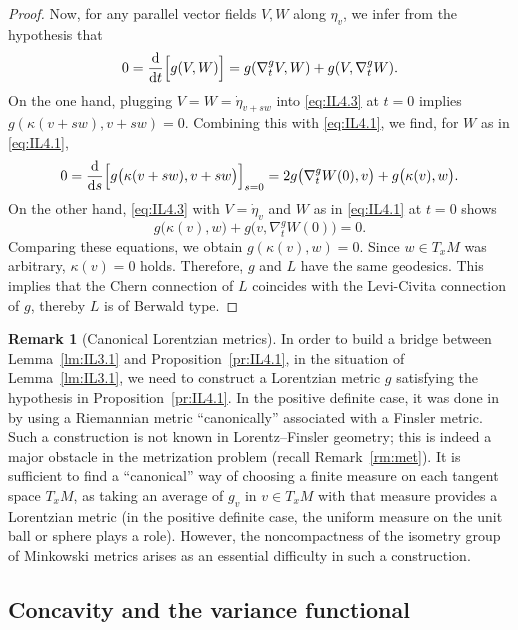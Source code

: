 \documentclass[a4paper,11pt]{article}
\numberwithin{equation}{section}
\theoremstyle{definition}
\newtheorem{remark}[definition]{Remark}
\theoremstyle{plain}
\newcommand{\dd}{\mathrm{d}}
\begin{document}
\begin{proof}
Now, for any parallel vector fields $V,W$ along $\eta_v$, we infer from the hypothesis that
\begin{equation}\label{eq:IL4.3}
0 =\frac{\dd}{\dd t} \Bigl[ g(V,W) \Bigr] =g(\nabla^g_t V,W) +g(V,\nabla^g_t W).
\end{equation}
On the one hand, plugging $V=W=\dot{\eta}_{v+sw}$ into \eqref{eq:IL4.3} at $t=0$ implies $g(\kappa(v+sw),v+sw)=0$.
Combining this with \eqref{eq:IL4.1}, we find, for $W$ as in \eqref{eq:IL4.1},
\[ 0 =\frac{\dd}{\dd s}\Bigl[ g\bigl( \kappa(v+sw),v+sw \bigr) \Bigr]_{s=0}
 =2g\bigl( \nabla^g_t W(0),v \bigr) +g\bigl( \kappa(v),w \bigr). \]
On the other hand, \eqref{eq:IL4.3} with $V=\dot{\eta}_v$ and $W$ as in \eqref{eq:IL4.1} at $t=0$ shows
\[ g\bigl( \kappa(v),w \bigr) +g\bigl (v,\nabla^g_t W(0) \bigr) =0. \]
Comparing these equations, we obtain $g(\kappa(v),w)=0$.
Since $w \in T_xM$ was arbitrary, $\kappa(v)=0$ holds.
Therefore, $g$ and $L$ have the same geodesics.
This implies that the Chern connection of $L$ coincides with the Levi-Civita connection of $g$, thereby $L$ is of Berwald type.
\end{proof}

\begin{remark}[Canonical Lorentzian metrics]\label{rm:cano}
In order to build a bridge between Lemma~\ref{lm:IL3.1} and Proposition~\ref{pr:IL4.1},
in the situation of Lemma~\ref{lm:IL3.1}, we need to construct a Lorentzian metric $g$
satisfying the hypothesis in Proposition~\ref{pr:IL4.1}.
In the positive definite case, it was done in \cite[Proposition~4.2]{IL} by using a Riemannian metric ``canonically'' associated with a Finsler metric.
Such a construction is not known in Lorentz--Finsler geometry;
this is indeed a major obstacle in the metrization problem (recall Remark~\ref{rm:met}).
It is sufficient to find a ``canonical'' way of choosing a finite measure on each tangent space $T_xM$,
as taking an average of $g_v$ in $v \in T_xM$ with that measure provides a Lorentzian metric
(in the positive definite case, the uniform measure on the unit ball or sphere plays a role).
However, the noncompactness of the isometry group of Minkowski metrics arises
as an essential difficulty in such a construction.
\end{remark}


\subsection{Concavity and the variance functional}\label{ssc:var}%
\end{document}

